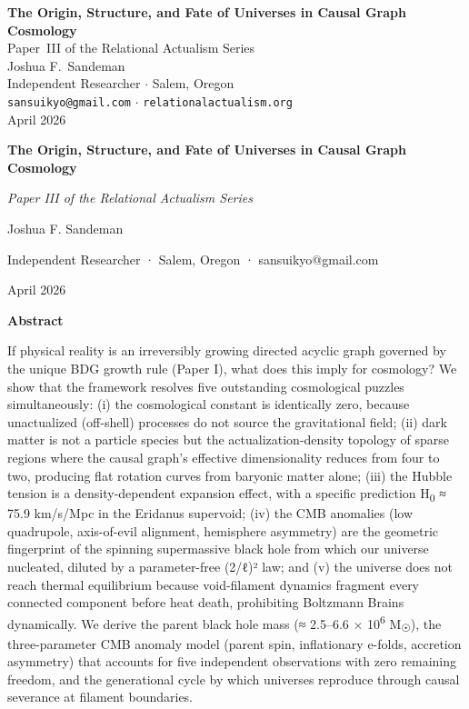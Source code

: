 \documentclass[12pt,a4paper]{article}
\begin{document}
\begin{center}
{\LARGE\bfseries The Origin, Structure, and Fate of Universes in Causal Graph Cosmology}\\[18pt]
{\large Paper~III of the Relational Actualism Series}\\[12pt]
{\large Joshua F.\ Sandeman}\\[4pt]
{\small Independent Researcher $\cdot$ Salem, Oregon}\\
{\small\texttt{sansuikyo@gmail.com} $\cdot$ \texttt{relationalactualism.org}}\\[6pt]
{\small April 2026}
\end{center}
\vspace{1em}

\textbf{The Origin, Structure, and Fate of Universes in Causal Graph
Cosmology}

\emph{Paper III of the Relational Actualism Series}

Joshua F. Sandeman

Independent Researcher · Salem, Oregon · sansuikyo@gmail.com

April 2026

\textbf{Abstract}

If physical reality is an irreversibly growing directed acyclic graph
governed by the unique BDG growth rule (Paper I), what does this imply
for cosmology? We show that the framework resolves five outstanding
cosmological puzzles simultaneously: (i) the cosmological constant is
identically zero, because unactualized (off-shell) processes do not
source the gravitational field; (ii) dark matter is not a particle
species but the actualization-density topology of sparse regions where
the causal graph's effective dimensionality reduces from four to two,
producing flat rotation curves from baryonic matter alone; (iii) the
Hubble tension is a density-dependent expansion effect, with a specific
prediction H\textsubscript{0} ≈ 75.9 km/s/Mpc in the Eridanus supervoid;
(iv) the CMB anomalies (low quadrupole, axis-of-evil alignment,
hemisphere asymmetry) are the geometric fingerprint of the spinning
supermassive black hole from which our universe nucleated, diluted by a
parameter-free (2/ℓ)² law; and (v) the universe does not reach thermal
equilibrium because void-filament dynamics fragment every connected
component before heat death, prohibiting Boltzmann Brains dynamically.
We derive the parent black hole mass (≈ 2.5--6.6 × 10\textsuperscript{6}
M\textsubscript{☉}), the three-parameter CMB anomaly model (parent spin,
inflationary e-folds, accretion asymmetry) that accounts for five
independent observations with zero remaining freedom, and the
generational cycle by which universes reproduce through causal severance
at filament boundaries.
\end{document}
